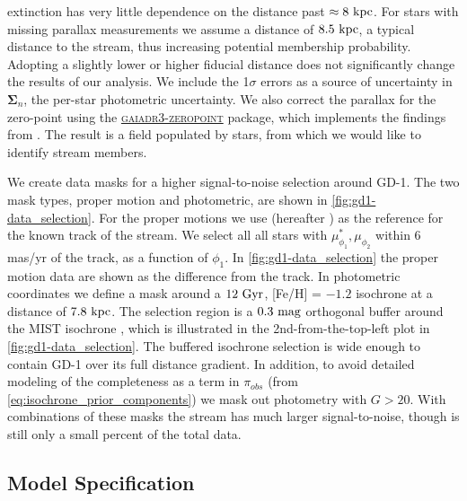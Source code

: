 \documentclass[twocolumn]{aastex631}
\newcommand{\code}[1]{\textsc{#1}}
\newcommand{\stream}[1]{#1}
\newcommand{\mbs}[1]{\boldsymbol{#1}}
\newcommand{\mcal}[1]{\mathcal{#1}}
\newcommand{\prior}{\mcal{\pi}}
\begin{document}
        extinction has very little dependence on the distance past $\approx 8 \
        \rm{kpc}$. For stars with missing parallax measurements we assume a
        distance of $8.5 \ \rm{kpc}$, a typical distance to the stream, thus
        increasing potential membership probability. Adopting a slightly lower
        or higher fiducial distance does not significantly change the results of
        our analysis. We include the 1$\sigma$ errors as a source of uncertainty
        in $\mbs{\Sigma}_n$, the per-star photometric uncertainty.  We also
        correct the parallax for the zero-point using the
        \href{https://pypi.org/project/gaiadr3-zeropoint/}{\code{gaiadr3-zeropoint}}
        package, which implements the findings from \cite{Lindegren+2021}.  The
        result is a field populated by \variable{output/gd1/ndata_variable.txt}
        stars, from which we would like to identify stream members.

        We create data masks for a higher signal-to-noise selection around
        \stream{GD-1}.  The two mask types, proper motion and photometric, are
        shown in \autoref{fig:gd1-data_selection}. For the proper motions we use
        \citet{Ibata+2021} (hereafter \citetalias{Ibata+2021}) as the reference
        for the known track of the stream. We select all all stars with
        $\mu_{\phi_1}^*, \mu_{\phi_2}$ within 6 mas/yr of the track, as a
        function of $\phi_1$. In \autoref{fig:gd1-data_selection} the proper
        motion data are shown as the difference from the 
        track.  In photometric coordinates we define a mask around a $12 \
        \rm{Gyr}$, [Fe/H] = $-1.2$ isochrone at a distance of $7.8 \ \rm{kpc}$.
        The selection region is a $0.3 \ \rm{mag}$ orthogonal buffer around the
        MIST isochrone \citep[using][]{brutus}, which is illustrated in the
        2nd-from-the-top-left plot in \autoref{fig:gd1-data_selection}. The
        buffered isochrone selection is wide enough to contain \stream{GD-1}
        over its full distance gradient.  In addition, to avoid detailed
        modeling of the completeness as a term in $\prior_{obs}$ (from
        \autoref{eq:isochrone_prior_components}) we mask out photometry with $G
        > 20$.  With combinations of these masks the stream has much larger
        signal-to-noise, though is still only a small percent of the total data.


    \subsection{Model Specification}\label{sub:results_gd1:model}
\end{document}
